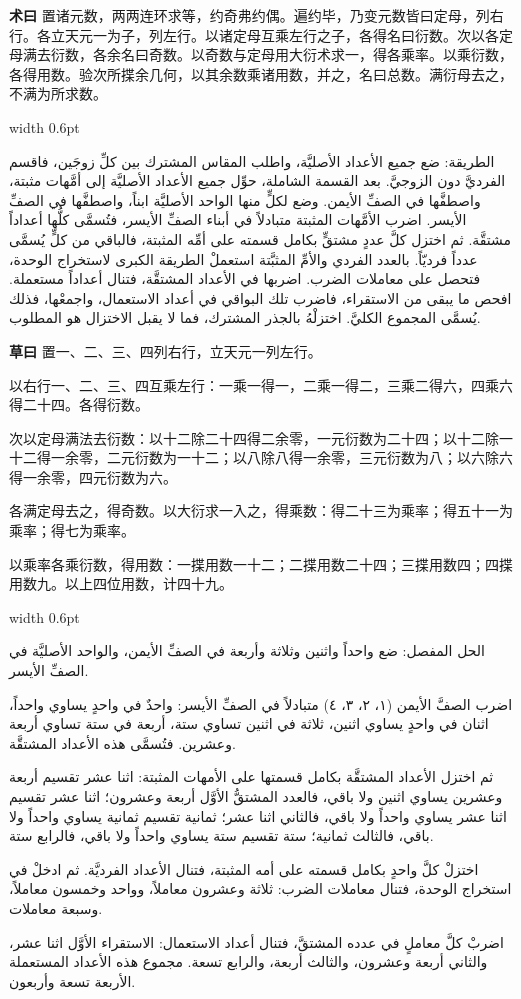 \documentclass[11pt,a4paper]{article}
\newlength{\cnwidth}
\newlength{\arwidth}
\newcommand{\paralleltext}[2]{%
  \par\medskip\noindent
  \begin{minipage}[t]{\cnwidth}%
    \small #1%
  \end{minipage}%
  \hfill\textcolor{colrule}{\vrule width 0.6pt}\hfill
  \begin{minipage}[t]{\arwidth}%
    \small\arabicfont\beginR #2\endR%
  \end{minipage}%
  \par\medskip
}
\newcommand{\cnlabel}[1]{\textbf{\color{notecolor}#1}}
\newcommand{\arlabel}[1]{\arabicfontbf\color{notecolor}\beginR #1\endR}
\begin{document}
\paralleltext{%
\cnlabel{术曰} 置诸元数，两两连环求等，约奇弗约偶。遍约毕，乃变元数皆曰定母，列右行。各立天元一为子，列左行。以诸定母互乘左行之子，各得名曰衍数。次以各定母满去衍数，各余名曰奇数。以奇数与定母用大衍术求一，得各乘率。以乘衍数，各得用数。验次所揲余几何，以其余数乘诸用数，并之，名曰总数。满衍母去之，不满为所求数。%
}{%
\arlabel{الطريقة:} ضع جميع الأعداد الأصليَّة، واطلب المقاس المشترك بين كلِّ زوجَين، فاقسم الفرديَّ دون الزوجيَّ. بعد القسمة الشاملة، حوِّل جميع الأعداد الأصليَّة إلى أمَّهات مثبتة، واصطفَّها في الصفِّ الأيمن. وضع لكلٍّ منها الواحد الأصليَّة ابناً، واصطفَّها في الصفِّ الأيسر. اضرب الأمَّهات المثبتة متبادلاً في أبناء الصفِّ الأيسر، فتُسمَّى كلُّها أعداداً مشتقَّة. ثم اختزل كلَّ عددٍ مشتقٍّ بكامل قسمته على أمِّه المثبتة، فالباقي من كلٍّ يُسمَّى عدداً فرديّاً. بالعدد الفردي والأمِّ المثبَّتة استعملْ الطريقة الكبرى لاستخراج الوحدة، فتحصل على معاملات الضرب. اضربها في الأعداد المشتقَّة، فتنال أعداداً مستعملة. افحص ما يبقى من الاستقراء، فاضرب تلك البواقي في أعداد الاستعمال، واجمعْها، فذلك يُسمَّى المجموع الكليَّ. اختزلْهُ بالجذر المشترك، فما لا يقبل الاختزال هو المطلوب.
}

\paralleltext{%
\cnlabel{草曰} 置一、二、三、四列右行，立天元一列左行。

以右行一、二、三、四互乘左行：一乘一得一，二乘一得二，三乘二得六，四乘六得二十四。各得衍数。

次以定母满法去衍数：以十二除二十四得二余零，一元衍数为二十四；以十二除一十二得一余零，二元衍数为一十二；以八除八得一余零，三元衍数为八；以六除六得一余零，四元衍数为六。

各满定母去之，得奇数。以大衍求一入之，得乘数：得二十三为乘率；得五十一为乘率；得七为乘率。

以乘率各乘衍数，得用数：一揲用数一十二；二揲用数二十四；三揲用数四；四揲用数九。以上四位用数，计四十九。%
}{%
\arlabel{الحل المفصل:} ضع واحداً واثنين وثلاثة وأربعة في الصفِّ الأيمن، والواحد الأصليَّة في الصفِّ الأيسر.

اضرب الصفَّ الأيمن (١، ٢، ٣، ٤) متبادلاً في الصفِّ الأيسر: واحدٌ في واحدٍ يساوي واحداً، اثنان في واحدٍ يساوي اثنين، ثلاثة في اثنين تساوي ستة، أربعة في ستة تساوي أربعة وعشرين. فتُسمَّى هذه الأعداد المشتقَّة.

ثم اختزل الأعداد المشتقَّة بكامل قسمتها على الأمهات المثبتة: اثنا عشر تقسيم أربعة وعشرين يساوي اثنين ولا باقي، فالعدد المشتقُّ الأوَّل أربعة وعشرون؛ اثنا عشر تقسيم اثنا عشر يساوي واحداً ولا باقي، فالثاني اثنا عشر؛ ثمانية تقسيم ثمانية يساوي واحداً ولا باقي، فالثالث ثمانية؛ ستة تقسيم ستة يساوي واحداً ولا باقي، فالرابع ستة.

اختزلْ كلَّ واحدٍ بكامل قسمته على أمه المثبتة، فتنال الأعداد الفرديَّة. ثم ادخلْ في استخراج الوحدة، فتنال معاملات الضرب: ثلاثة وعشرون معاملاً، وواحد وخمسون معاملاً، وسبعة معاملات.

اضربْ كلَّ معاملٍ في عدده المشتقَّ، فتنال أعداد الاستعمال: الاستقراء الأوَّل اثنا عشر، والثاني أربعة وعشرون، والثالث أربعة، والرابع تسعة. مجموع هذه الأعداد المستعملة الأربعة تسعة وأربعون.
}
\end{document}
